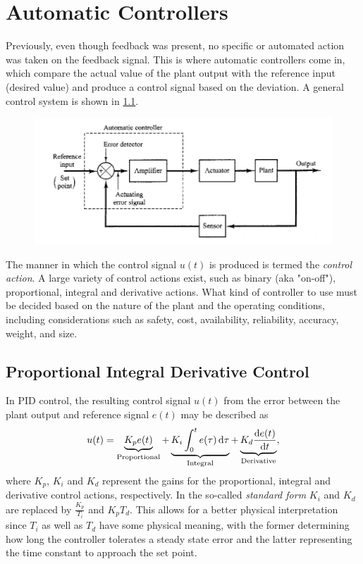 \documentclass[]{report}
\begin{document}
\chapter{Automatic Controllers}
Previously, even though feedback was present, no specific or automated action was taken on the feedback signal.
This is where automatic controllers come in, which compare the actual value of the plant output with the reference input (desired value) and produce a control signal based on the deviation.
A general control system is shown in \cref{fig:controlsys}.
\begin{figure}
	\centering
	\includegraphics[width=0.7\linewidth]{graphics/controlSys}
	\caption{}
	\label{fig:controlsys}
\end{figure}
The manner in which the control signal $u(t)$ is produced is termed the \textit{control action}.
A large variety of control actions exist, such as binary (aka "on-off"), proportional, integral and derivative actions. 
What kind of controller to use must be decided based on the nature of the plant and the operating conditions, including considerations such as safety, cost, availability, reliability, accuracy, weight, and size.
\section{Proportional Integral Derivative Control}
In PID control, the resulting control signal \(u(t)\) from the error between the plant output and reference signal \(e(t)\) may be described as 
\begin{equation}
	u(t) = \underbrace{K_pe(t)}_{\text{Proportional}} + \underbrace{K_i\int_{0}^{t}e(\tau)\dd{\tau}}_{\text{Integral}} + \underbrace{K_d\diff{e(t)}{t}}_{\text{Derivative}},
\end{equation}
where $K_p$, $K_i$ and $K_d$ represent the gains for the proportional, integral and derivative control actions, respectively.
In the so-called \textit{standard form} $K_i$ and $K_d$ are replaced by $\frac{K_p}{T_i}$ and $K_pT_d$. 
This allows for a better physical interpretation since $T_i$ as well as $T_d$ have some physical meaning, with the former determining how long the controller tolerates a steady state error and the latter representing the time constant to approach the set point. 
\end{document}
